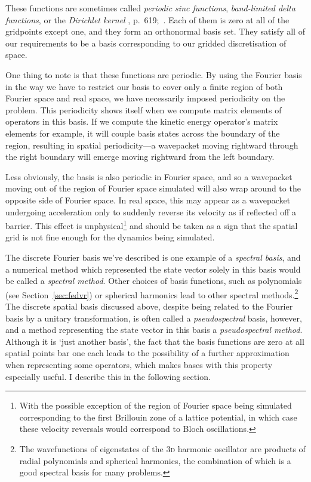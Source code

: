 These functions are sometimes called \emph{periodic sinc functions}, \emph{band-limited delta functions}, or the \emph{Dirichlet kernel}
\citeleft{}, p.~619;~\citeright.
Each of them is zero at all of the gridpoints except one, and they form an orthonormal basis set. They satisfy all of our requirements to be a basis corresponding to our gridded discretisation of space.

One thing to note is that these functions are periodic. By using the Fourier basis in the way we have to restrict our basis to cover only a finite region of both Fourier space and real space, we have necessarily imposed periodicity on the problem. This periodicity shows itself when we compute matrix elements of operators in this basis. If we compute the kinetic energy operator's matrix elements for example, it will couple basis states across the boundary of the region, resulting in spatial periodicity---a wavepacket moving rightward through the right boundary will emerge moving rightward from the left boundary.

Less obviously, the basis is also periodic in Fourier space, and so a wavepacket moving out of the region of Fourier space simulated will also wrap around to the opposite side of Fourier space. In real space, this may appear as a wavepacket undergoing acceleration only to suddenly reverse its velocity as if reflected off a barrier. This effect is unphysical\footnote{With the possible exception of the region of Fourier space being simulated corresponding to the first Brillouin zone of a lattice potential, in which case these velocity reversals would correspond to Bloch oscillations.} and should be taken as a sign that the spatial grid is not fine enough for the dynamics being simulated.

The discrete Fourier basis we've described is one example of a \emph{spectral basis}, and a numerical method which represented the state vector solely in this basis would be called a \emph{spectral method}. Other choices of basis functions, such as polynomials (see Section~\ref{sec:fedvr}) or spherical harmonics lead to other spectral methods.\footnote{The wavefunctions of eigenstates of the \textsc{3d} harmonic oscillator are products of radial polynomials and spherical harmonics, the combination of which is a good spectral basis for many problems.} The discrete spatial basis discussed above, despite being related to the Fourier basis by a unitary transformation, is often called a \emph{pseudospectral} basis, however, and a method representing the state vector in this basis a \emph{pseudospectral method}. Although it is `just another basis', the fact that the basis functions are zero at all spatial points bar one each leads to the possibility of a further approximation when representing some operators, which makes bases with this property especially useful. I describe this in the following section.

